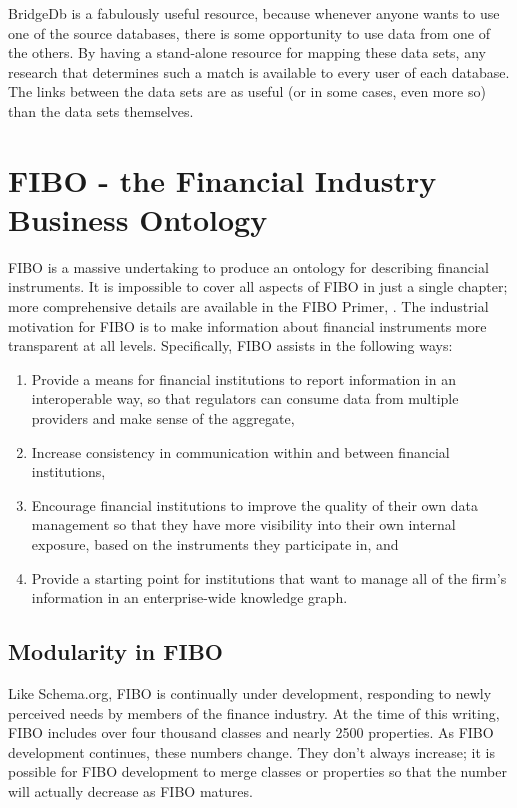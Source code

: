 BridgeDb is a fabulously useful resource, because whenever anyone wants to use one of the
source databases, there is some opportunity to use data from one of the others.  By having a 
stand-alone resource for mapping these data sets, any research that determines such 
a match is available to every user of each database.  The links between the data sets are 
as useful (or in some cases, even more so) than the data sets themselves. 



\section{FIBO - the Financial Industry Business Ontology}
\label{section:fibo}

FIBO is a massive undertaking to produce an ontology for describing financial instruments.  It is impossible to cover all aspects of FIBO 
in just a single chapter; more comprehensive details are available in the FIBO Primer,
\cite{fiboprimer}.   The industrial
motivation for FIBO is to make information about financial instruments more transparent at all levels. 
Specifically, 
FIBO assists in the following ways:

\begin{enumerate}
    \item Provide a means for financial institutions to report information in an interoperable way, so that regulators can 
    consume data from multiple providers and make sense of the aggregate, 
    \item Increase consistency in communication within and between financial institutions, 
    \item Encourage financial institutions to improve the quality of their own data management so that they have 
    more visibility into their own internal exposure, based on the instruments they participate in, and 
    \item Provide a starting point for institutions that want to manage all of the firm's information in an enterprise-wide knowledge graph. 
\end{enumerate}

\subsection{Modularity in FIBO}

Like Schema.org, FIBO is continually under development, responding to newly perceived needs by members of the 
finance industry.  At the time of this writing, FIBO includes over four thousand classes and nearly 2500 properties. As 
FIBO development continues, these numbers change. They don't always increase; it is possible for FIBO development to 
merge classes or properties so that the number will actually decrease as FIBO matures. 

